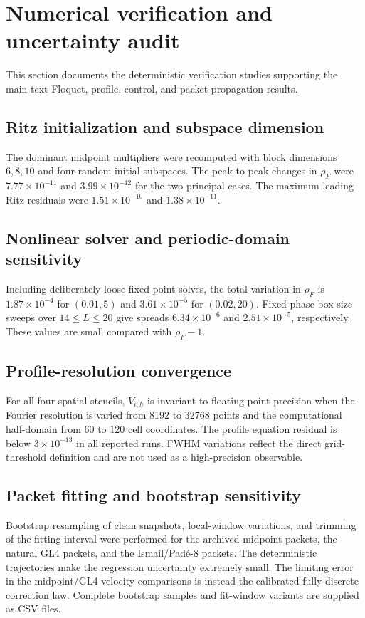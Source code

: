 \section{Numerical verification and uncertainty audit}

This section documents the deterministic verification studies supporting the
main-text Floquet, profile, control, and packet-propagation results.

\subsection{Ritz initialization and subspace dimension}
The dominant midpoint multipliers were recomputed with block dimensions
$6,8,10$ and four random initial subspaces.  The peak-to-peak changes in
$\rho_F$ were $7.77\times10^{-11}$ and $3.99\times10^{-12}$ for the two
principal cases.  The maximum leading Ritz residuals were
$1.51\times10^{-10}$ and $1.38\times10^{-11}$.

\subsection{Nonlinear solver and periodic-domain sensitivity}
Including deliberately loose fixed-point solves, the total variation in
$\rho_F$ is $1.87\times10^{-4}$ for $(0.01,5)$ and $3.61\times10^{-5}$ for
$(0.02,20)$.  Fixed-phase box-size sweeps over $14\le L\le20$ give spreads
$6.34\times10^{-6}$ and $2.51\times10^{-5}$, respectively.  These values are
small compared with $\rho_F-1$.

\subsection{Profile-resolution convergence}
For all four spatial stencils, $V_{i,h}$ is invariant to floating-point
precision when the Fourier resolution is varied from 8192 to 32768 points and
the computational half-domain from 60 to 120 cell coordinates.  The profile
equation residual is below $3\times10^{-13}$ in all reported runs.  FWHM
variations reflect the direct grid-threshold definition and are not used as a
high-precision observable.

\subsection{Packet fitting and bootstrap sensitivity}
Bootstrap resampling of clean snapshots, local-window variations, and trimming
of the fitting interval were performed for the archived midpoint packets, the
natural GL4 packets, and the Ismail/Pad\'e-8 packets.  The deterministic
trajectories make the regression uncertainty extremely small.  The limiting
error in the midpoint/GL4 velocity comparisons is instead the calibrated
fully-discrete correction law.  Complete bootstrap samples and fit-window
variants are supplied as CSV files.

